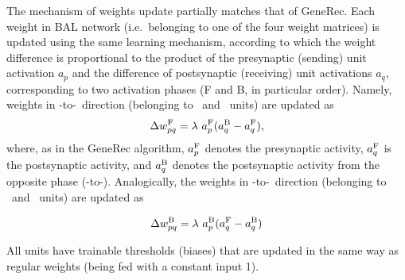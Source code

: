 The mechanism of weights update partially matches that of GeneRec. Each weight in BAL network (i.e.~belonging to one of the four weight matrices) is updated using the same learning mechanism, according to which the weight difference is proportional to the product of the presynaptic (sending) unit activation $a_p$ and the difference of postsynaptic (receiving) unit activations $a_q$, corresponding to two activation phases (F and B, in particular order). Namely, weights in \Bx-to-\By \ direction (belonging to \Bh \ and \By \ units) are updated as
\begin{equation}
\Delta w_{pq}^{\rm F} = \lambda \ a^{\rm F}_p(a^{\rm B}_q - a^{\rm F}_q),
\end{equation}
where, as in the GeneRec algorithm, $a^{\rm F}_p$ denotes the presynaptic activity, $a^{\rm F}_q$ is the postsynaptic activity, and $a^{\rm B}_q$ denotes the postsynaptic activity from the opposite phase (\By-to-\Bh). Analogically, the weights in \By-to-\Bx \ direction (belonging to \Bh \ and \Bx \ units) are updated as

\begin{equation}
\Delta w_{pq}^{\rm B} = \lambda \ a^{\rm B}_p(a^{\rm F}_q - a^{\rm B}_q)
\end{equation}

All units have trainable thresholds (biases) that are updated in the same way as regular weights (being fed with a constant input 1).

 


